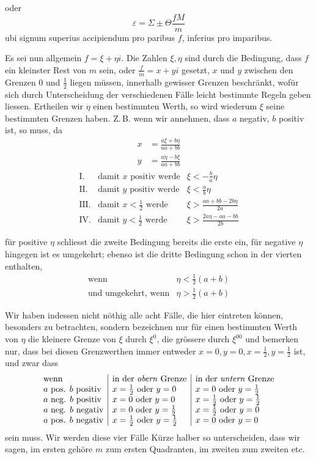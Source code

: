 %
oder
\[
\varepsilon=\Sigma\pm\Theta\frac{fM}{m}
\]
ubi signum superius accipiendum pro paribus $f$, inferius pro imparibus.

Es sei nun allgemein $f=\xi+\eta i$. Die Zahlen $\xi,\eta$ sind durch die Bedingung, dass $f$ ein kleinster Rest von $m$ sein, oder $\frac{f}{m}=x+yi$ gesetzt, $x$ und $y$ zwischen den Grenzen $0$ und $\frac12$ liegen müssen, innerhalb gewisser Grenzen beschränkt, wofür sich durch Unterscheidung der verschiedenen Fälle leicht bestimmte Regeln geben liessen. Ertheilen wir $\eta$ einen bestimmten Werth, so wird wiederum $\xi$ seine bestimmten Grenzen haben. Z.\,B. wenn wir annehmen, dass $a$ negativ, $b$ positiv ist, so muss, da
\[
\begin{aligned}
x&=\frac{a\xi+b\eta}{aa+bb}\\
y&=\frac{a\eta-b\xi}{aa+bb}
\end{aligned}
\]
\[
\begin{array}{rll}
\mathrm{I.}&\text{damit }x\text{ positiv werde}&\xi<-\frac{b}{a}\eta\\[3pt]
\mathrm{II.}&\text{damit }y\text{ positiv werde}&\xi<\frac{a}{b}\eta\\[3pt]
\mathrm{III.}&\text{damit }x<\frac12\text{ werde}&\xi>\frac{aa+bb-2b\eta}{2a}\\[3pt]
\mathrm{IV.}&\text{damit }y<\frac12\text{ werde}&\xi>\frac{2a\eta-aa-bb}{2b}
\end{array}
\]

für positive $\eta$ schliesst die zweite Bedingung bereits die erste ein, für negative $\eta$ hingegen ist es umgekehrt; ebenso ist die dritte Bedingung schon in der vierten enthalten,
\[
\begin{array}{ll}
\text{wenn}&\eta<\tfrac12(a+b)\\
\text{und umgekehrt, wenn}&\eta>\tfrac12(a+b)
\end{array}
\]

Wir haben indessen nicht nöthig alle acht Fälle, die hier eintreten können, besonders zu betrachten, sondern bezeichnen nur für einen bestimmten Werth von $\eta$ die kleinere Grenze von $\xi$ durch $\xi^0$, die grössere durch $\xi^{00}$ und bemerken nur, dass bei diesen Grenzwerthen immer entweder $x=0,y=0,x=\frac12,y=\frac12$ ist, und zwar dass
%
\[
\begin{array}{l|l|l}
\text{wenn}&\text{in der \emph{obern} Grenze}&\text{in der \emph{untern} Grenze}\\
a\text{ pos. }b\text{ positiv}&x=\frac12\text{ oder }y=0&x=0\text{ oder }y=\frac12\\
a\text{ neg. }b\text{ positiv}&x=0\text{ oder }y=0&x=\frac12\text{ oder }y=\frac12\\
a\text{ neg. }b\text{ negativ}&x=0\text{ oder }y=\frac12&x=\frac12\text{ oder }y=0\\
a\text{ pos. }b\text{ negativ}&x=\frac12\text{ oder }y=\frac12&x=0\text{ oder }y=0
\end{array}
\]
sein muss. Wir werden diese vier Fälle Kürze halber so unterscheiden, dass wir sagen, im ersten gehöre $m$ zum ersten Quadranten, im zweiten zum zweiten etc.

